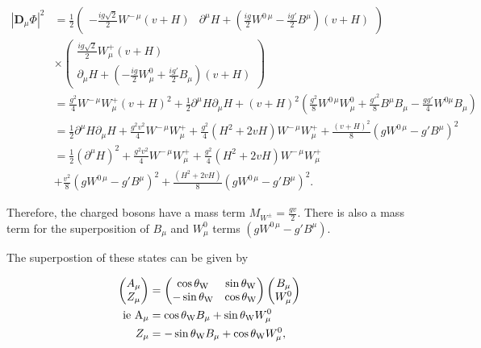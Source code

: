 \documentclass{article}
\begin{document}
\begin{equation}
\begin{split}
|\bm{D}_\mu\Phi|^2 & = \frac{1}{2}\left(\begin{matrix}
-\frac{ig\sqrt{2}}{2}W^{-\,\mu} (v+H) & 
\partial^\mu H + \left(\frac{ig}{2}W^{0\,\mu}  - \frac{ig'}{2}B^\mu\right)(v+H)
\end{matrix}\right)\\
&\times\left(\begin{matrix}
\frac{ig\sqrt{2}}{2}W^{+}_\mu (v+H)\\
\partial_\mu H + \left(-\frac{ig}{2}W^{0}_\mu  + \frac{ig'}{2}B_\mu\right)(v+H)
\end{matrix}\right) \\
& = \frac{g^2}{4}W^{-\,\mu}W^{+}_\mu(v+H)^2 + \frac{1}{2}\partial^\mu H \partial_\mu H + (v+H)^2 \left( \frac{g^2}{8}W^{0\,\mu}W^{0}_\mu + \frac{g'^2}{8}B^\mu B_\mu - \frac{gg'}{4}W^{0\mu}B_\mu \right) \\
& = \frac{1}{2}\partial^\mu H \partial_\mu H + \frac{g^2v^2}{4}W^{-\,\mu}W^{+}_\mu + \frac{g^2}{4}(H^2 + 2vH)W^{-\,\mu}W^{+}_\mu  + \frac{(v+H)^2}{8}(gW^{0\,\mu} - g' B^\mu)^2 \\
& = \frac{1}{2}(\partial^\mu H)^2 + \frac{g^2v^2}{4}W^{-\,\mu}W^{+}_\mu + \frac{g^2}{4}(H^2 + 2vH)W^{-\,\mu}W^{+}_\mu \\
& + \frac{v^2}{8}(gW^{0\,\mu} - g' B^\mu)^2 + \frac{(H^2 + 2vH)}{8}(gW^{0\,\mu} - g' B^\mu)^2.
\end{split}
\end{equation}

Therefore, the charged bosons have a mass term $M_{W^{\pm}} = \frac{gv}{2}$. There is also a mass term for the superposition of $B_\mu$ and $W^{0}_\mu$ terms $(gW^{0\,\mu} - g' B^\mu)$.

The superpostion of these states can be given by

\begin{equation}
\begin{split}
\left( \begin{matrix}A_\mu \\ Z_\mu\end{matrix}\right) & = \left(\begin{matrix} 
\cos\theta_{\rm{W}} & \sin\theta_{\rm{W}} \\
-\sin\theta_{\rm{W}} & \cos\theta_{\rm{W}}
\end{matrix}\right) \left( \begin{matrix}
B_\mu \\ W^{0}_\mu\end{matrix} \right) \\
\rm{ie}\,\, A_\mu & = \cos\theta_{\rm{W}} B_\mu + \sin\theta_{\rm{W}}W^{0}_\mu \\
Z_\mu & = -\sin\theta_{\rm{W}} B_\mu + \cos\theta_{\rm{W}}W^{0}_\mu,
\end{split}
\end{equation}
\end{document}
